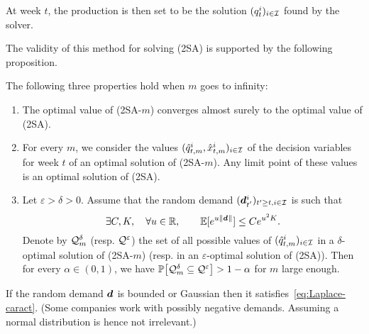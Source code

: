 At week $t$, the production is then set to be the solution $(q_t^i)_{i\in\mathcal{I}}$ found by the solver.

The validity of this method for solving (2SA) is supported by the following proposition.

\begin{prop}
\label{prop:cvgce-2SAm}
The following three properties hold when $m$ goes to infinity:
\begin{enumerate}[label=\textup{(\roman*)}]
\item The optimal value of \textup{(2SA-$m$)} converges almost surely to the optimal value of \textup{(2SA)}.

\item For every $m$, we consider the values $(\hat{q}_{t,m}^i,\hat{x}_{t,m}^i)_{i\in\mathcal{I}}$ of the decision variables for week $t$ of an optimal solution of \textup{(2SA-$m$)}. Any limit point of these values is an optimal solution of \textup{(2SA)}.

\item \label{delta-eps-cvgce}Let $\varepsilon> \delta > 0$. Assume that the random demand $(\va\demand_{t'}^i)_{t'\geq t, i\in\REF}$ is such that
\begin{equation}
\exists C,K, \quad \forall u \in \RR, \qquad \EE[e^{u \|\va d\|}] \leq C e^{u^2 K} . \label{eq:Laplace-caract}
\end{equation}
 Denote by $\mathcal{Q}_m^{\delta}$ (resp. $\mathcal{Q}^{\varepsilon}$) the set of all possible values of $(\hat {q}_{t,m}^i)_{i\in\mathcal{I}}$ in a $\delta$-optimal solution of \textup{(2SA-$m$)} (resp. in an $\varepsilon$-optimal solution of \textup{(2SA)}). Then for every $\alpha \in (0,1)$, we have $ \PP\sqbracket{\cQ_m^{\delta}\subseteq\cQ^{\varepsilon}} > 1 - \alpha$ for $m$ large enough.
\end{enumerate}
\end{prop}

If the random demand $\va\demand$ is bounded or Gaussian then it satisfies~\eqref{eq:Laplace-caract}. (Some companies work with possibly negative demands. Assuming a normal distribution is hence not irrelevant.) 


